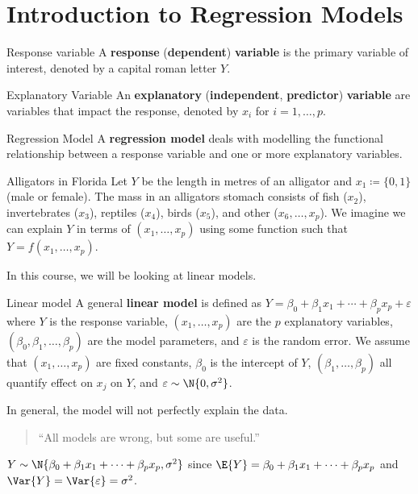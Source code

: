 \section{Introduction to Regression Models}
\begin{Definition}{Response variable}{}
    A \textbf{response} (\textbf{dependent})
    \textbf{variable} is the primary variable
    of interest, denoted by a capital
    roman letter $ Y $.
\end{Definition}
\begin{Definition}{Explanatory Variable}{}
    An \textbf{explanatory} (\textbf{independent}, \textbf{predictor})
    \textbf{variable} are variables that
    impact the response, denoted by $ x_i $
    for $ i=1,\ldots,p $.
\end{Definition}
\begin{Definition}{Regression Model}{}
    A \textbf{regression model}
    deals with modelling the functional relationship between a response
    variable and one or more explanatory variables.
\end{Definition}
\begin{Example}{Alligators in Florida}{}
    Let $ Y $ be the length in metres of an alligator
    and $ x_1\coloneq \{0,1\} $ (male or female).
    The mass in an alligators stomach consists of
    fish ($ x_2 $), invertebrates ($ x_3 $),
    reptiles ($ x_4 $), birds ($ x_5 $),
    and other ($ x_6,\ldots,x_p $).
    We imagine we can explain $ Y $ in terms
    of $ (x_1,\ldots,x_p) $ using some function
    such that $ Y=f(x_1,\ldots,x_p) $.
\end{Example}
In this course, we will be looking at linear models.
\begin{Definition}{Linear model}{}
    A general \textbf{linear model} is defined as
    $ Y=\beta_0+\beta_1x_1+\cdots+\beta_p x_p+\varepsilon $
    where $ Y $ is the response variable, $ (x_1,\ldots,x_p) $
    are the $ p $ explanatory variables,
    $ (\beta_0,\beta_1,\ldots,\beta_p) $
    are the model parameters, and $ \varepsilon $
    is the random error. We assume
    that $ (x_1,\ldots,x_p) $ are fixed constants,
    $ \beta_0 $ is the intercept of $ Y $,
    $ (\beta_1,\ldots,\beta_p) $ all quantify effect on $ x_j $
    on $ Y $, and $ \varepsilon \sim \N{0,\sigma^2} $.
\end{Definition}
\begin{Remark}{}{}
    In general, the model will not perfectly explain the data.
    \begin{quote}
        ``All models are wrong, but some are useful.''
    \end{quote}
\end{Remark}
$ Y \sim \N{\beta_0+\beta_1x_1+\cdots+\beta_p x_p,\sigma^2} $
since $ \E{Y}=\beta_0+\beta_1x_1+\cdots+\beta_p x_p $ and
$ \Var{Y}=\Var{\varepsilon}=\sigma^2 $.
